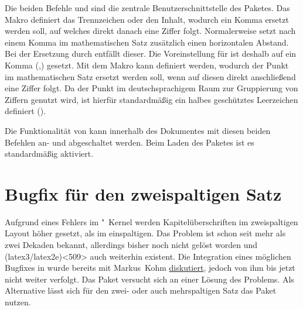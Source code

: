 \begin{DeclareEntity}{}
\begin{Declaration}
  {}
\begin{Declaration}
  {}
\printdeclarationlist
%
Die beiden Befehle  und  sind die zentrale 
Benutzerschnittstelle des Paketes. Das Makro  definiert das 
Trennzeichen oder den Inhalt, wodurch ein Komma ersetzt werden soll, auf 
welches direkt danach eine Ziffer folgt. Normalerweise setzt 
nach einem Komma im mathematischen Satz zusätzlich einen horizontalen Abstand.
Bei der Ersetzung durch  entfällt dieser. Die Voreinstellung
für  ist deshalb auf ein Komma (,) gesetzt. Mit dem Makro 
 kann definiert werden, wodurch der Punkt im mathematischen 
Satz ersetzt werden soll, wenn auf diesen direkt anschließend eine Ziffer 
folgt. Da der Punkt im deutschsprachigem Raum zur Gruppierung von Ziffern 
genutzt wird, ist hierfür standardmäßig ein halbes geschütztes Leerzeichen 
definiert (\Macro*{,}).
\end{Declaration}
\end{Declaration}

\begin{Declaration}
  {}
\begin{Declaration}
  {}
\printdeclarationlist
%
%
Die Funktionalität von  kann innerhalb des Dokumentes mit 
diesen beiden Befehlen an- und abgeschaltet werden. Beim Laden des Paketes ist 
es standardmäßig aktiviert.%
\end{Declaration}
\end{Declaration}
%
%
\end{DeclareEntity}



\section[%
  Das Paket \Package{twocolfix} -- Bugfix für den zweispaltigen Satz%
]{%
  Bugfix für den zweispaltigen Satz%
}
%
\begin{DeclareEntity}{}
Aufgrund eines Fehlers im "~Kernel werden Kapitelüberschriften im
zweispaltigen Layout höher gesetzt, als im einspaltigen. Das Problem ist schon 
seit mehr als zwei Dekaden bekannt, allerdings bisher noch nicht gelöst worden 
und (latex3/latex2e)<509> auch weiterhin 
existent. Die Integration eines möglichen Bugfixes in \KOMAScript wurde bereits 
mit Markus~Kohm \href{http://www.komascript.de/node/1681}{diskutiert}, jedoch 
von ihm bis jetzt nicht weiter verfolgt. Das Paket  versucht 
sich an einer Lösung des Problems. Als Alternative lässt sich für den zwei- 
oder auch mehrspaltigen Satz das Paket  nutzen.
\end{DeclareEntity}


